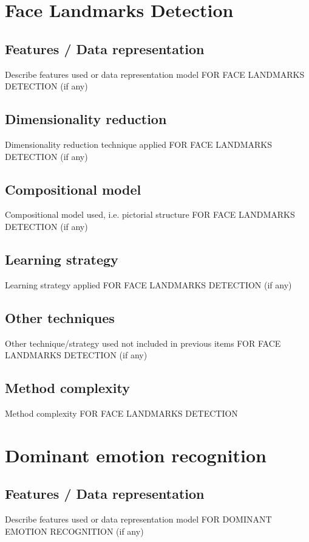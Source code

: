 \documentclass{article}
\begin{document}
\section{Face Landmarks Detection}
\subsection{Features / Data representation}
Describe features used or data representation model FOR FACE LANDMARKS DETECTION (if any)

\subsection{Dimensionality reduction}
Dimensionality reduction technique applied FOR FACE LANDMARKS DETECTION (if any)

\subsection{Compositional model}
Compositional model used, i.e. pictorial structure FOR FACE LANDMARKS DETECTION (if any)

\subsection{Learning strategy}
Learning strategy applied FOR FACE LANDMARKS DETECTION (if any)

\subsection{Other techniques}
Other technique/strategy used not included in previous items FOR FACE LANDMARKS DETECTION (if any)

\subsection{Method complexity}
Method complexity FOR FACE LANDMARKS DETECTION


\section{Dominant emotion recognition}
\subsection{Features / Data representation}
Describe features used or data representation model FOR DOMINANT EMOTION RECOGNITION (if any)
\end{document}
